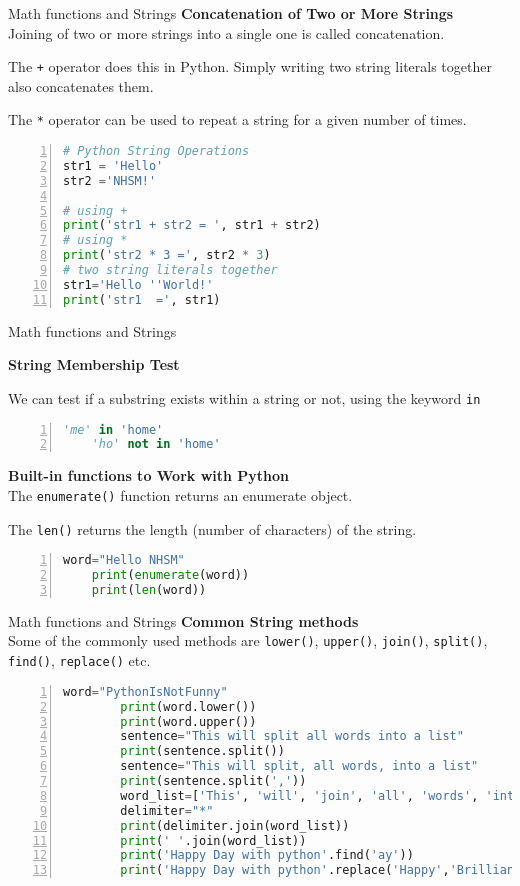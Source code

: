 \begin{frame}[fragile]{Math functions and Strings}
    {\center \bf Concatenation of Two or More Strings\\}
        Joining of two or more strings into a single one is called concatenation.


        The \verb|+| operator does this in Python. Simply writing two string literals together also concatenates them.

        The \verb|*| operator can be used to repeat a string for a given number of times.
\begin{lstlisting}[numbers=left,showstringspaces=false,language=python]
# Python String Operations
str1 = 'Hello'
str2 ='NHSM!'

# using +
print('str1 + str2 = ', str1 + str2)
# using *
print('str2 * 3 =', str2 * 3)
# two string literals together
str1='Hello ''World!'
print('str1  =', str1)
\end{lstlisting}
\end{frame}
\begin{frame}[fragile]{Math functions and Strings}

    {\center \bf String Membership Test\\}

    We can test if a substring exists within a string or not, using the keyword \verb|in|
\begin{lstlisting}[numbers=left,showstringspaces=false,language=python]
    'me' in 'home'
    'ho' not in 'home'
\end{lstlisting}
{\center \bf Built-in functions to Work with Python\\}
The \verb|enumerate()| function returns an enumerate object.


The \verb|len()| returns the length (number of characters) of the string.
\begin{lstlisting}[numbers=left,showstringspaces=false,language=python]
    word="Hello NHSM"
    print(enumerate(word))
    print(len(word))
\end{lstlisting}
\end{frame}
\begin{frame}[fragile]{Math functions and Strings}
    {\center \bf Common String methods\\}
    Some of the commonly used methods are \verb|lower()|, \verb|upper()|, \verb|join()|, \verb|split()|, \verb|find()|, \verb|replace()| etc. 
    \begin{lstlisting}[numbers=left,showstringspaces=false,language=python]
        word="PythonIsNotFunny"
        print(word.lower())
        print(word.upper())
        sentence="This will split all words into a list"
        print(sentence.split())
        sentence="This will split, all words, into a list"
        print(sentence.split(','))
        word_list=['This', 'will', 'join', 'all', 'words', 'into', 'a', 'string']
        delimiter="*"
        print(delimiter.join(word_list))
        print(' '.join(word_list))
        print('Happy Day with python'.find('ay'))
        print('Happy Day with python'.replace('Happy','Brilliant'))
    \end{lstlisting}
\end{frame}
